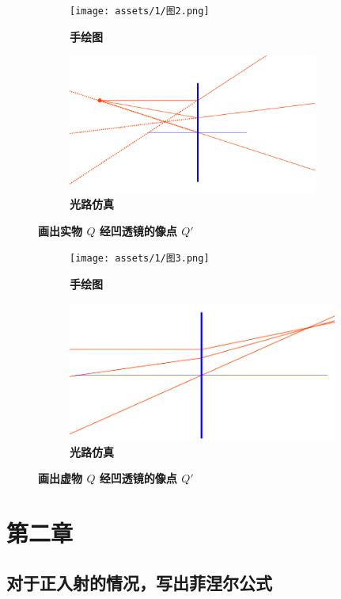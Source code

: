 \documentclass[UTF8]{report}
\theoremstyle{MyLineTheoremStyle} %
\theoremstyle{MyBlockTheoremStyle} %
\theoremstyle{MySubsubsectionStyle} %
\begin{document}
\begin{figure}[H]\centering
    \begin{subfigure}[t]{0.47\textwidth}\centering
        \texttt{[image: assets/1/图2.png]}
        \caption{\bfseries 手绘图 }
    \end{subfigure}\begin{subfigure}[t]{0.52\textwidth}\centering
        \includegraphics[height=130pt]{assets/1/2.png}
        \caption{\bfseries 光路仿真 }
    \end{subfigure}
    \caption{\bfseries 画出实物 $Q$ 经凹透镜的像点 $Q'$}
\end{figure}

    \begin{figure}[H]\centering
\begin{subfigure}[t]{0.47\textwidth}\centering
    \texttt{[image: assets/1/图3.png]}
    \caption{\bfseries 手绘图 }
\end{subfigure}\begin{subfigure}[t]{0.52\textwidth}\centering
    \includegraphics[height=130pt]{assets/1/3.png}
    \caption{\bfseries 光路仿真 }
\end{subfigure}
\caption{\bfseries 画出虚物 $Q$ 经凹透镜的像点 $Q'$}
\end{figure}



\chapter{第二章}\thispagestyle{fancy}

\section{对于正入射的情况，写出菲涅尔公式}
\end{document}
